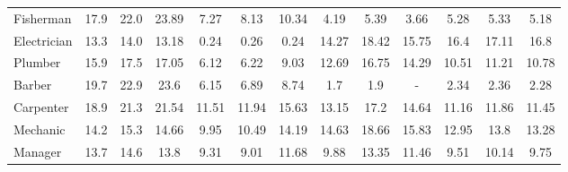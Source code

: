 \begin{table}[htbp!]
{\begin{tabular}{l|ccc|ccc|ccc|ccc}
Fisherman
& \cellcolor{purple9} 17.9 & \cellcolor{green10} 22.0 & \cellcolor{green10} 23.89
&\cellcolor{purple4} 7.27 & \cellcolor{purple5} 8.13 & \cellcolor{green6} 10.34
&\cellcolor{purple3} 4.19 & \cellcolor{green3} 5.39 & \cellcolor{purple2} 3.66
&\cellcolor{green3} 5.28 & \cellcolor{green3} 5.33 & \cellcolor{green3} 5.18
\\
Electrician
& \cellcolor{purple7} 13.3 & \cellcolor{purple8} 14.0 & \cellcolor{purple7} 13.18
&\cellcolor{green1} 0.24 & \cellcolor{green1} 0.26 & \cellcolor{green1} 0.24
&\cellcolor{purple8} 14.27 & \cellcolor{purple10} 18.42 & \cellcolor{purple8} 15.75
&\cellcolor{purple9} 16.4 & \cellcolor{purple9} 17.11 & \cellcolor{purple9} 16.8
\\
Plumber
& \cellcolor{purple8} 15.9 & \cellcolor{purple9} 17.5 & \cellcolor{purple9} 17.05
&\cellcolor{purple4} 6.12 & \cellcolor{purple4} 6.22 & \cellcolor{purple5} 9.03
&\cellcolor{purple7} 12.69 & \cellcolor{purple9} 16.75 & \cellcolor{purple8} 14.29
&\cellcolor{purple6} 10.51 & \cellcolor{green6} 11.21 & \cellcolor{purple6} 10.78
\\
Barber
& \cellcolor{purple10} 19.7 & \cellcolor{purple10} 22.9 & \cellcolor{purple10} 23.6
&\cellcolor{purple4} 6.15 & \cellcolor{purple4} 6.89 & \cellcolor{green5} 8.74
&\cellcolor{green1} 1.7 & \cellcolor{green1} 1.9 & \cellcolor{lightgray} -
&\cellcolor{green2} 2.34 & \cellcolor{green2} 2.36 & \cellcolor{green2} 2.28
\\
Carpenter
& \cellcolor{purple10} 18.9 & \cellcolor{purple10} 21.3 & \cellcolor{purple10} 21.54
&\cellcolor{purple6} 11.51 & \cellcolor{purple6} 11.94 & \cellcolor{purple8} 15.63
&\cellcolor{purple7} 13.15 & \cellcolor{purple9} 17.2 & \cellcolor{purple8} 14.64
&\cellcolor{purple6} 11.16 & \cellcolor{purple6} 11.86 & \cellcolor{purple6} 11.45
\\
Mechanic
& \cellcolor{purple8} 14.2 & \cellcolor{purple8} 15.3 & \cellcolor{purple8} 14.66
&\cellcolor{purple5} 9.95 & \cellcolor{purple6} 10.49 & \cellcolor{purple8} 14.19
&\cellcolor{purple8} 14.63 & \cellcolor{purple10} 18.66 & \cellcolor{purple8} 15.83
&\cellcolor{purple7} 12.95 & \cellcolor{purple7} 13.8 & \cellcolor{purple7} 13.28
\\
Manager
& \cellcolor{purple7} 13.7 & \cellcolor{purple8} 14.6 & \cellcolor{purple7} 13.8
&\cellcolor{purple5} 9.31 & \cellcolor{purple5} 9.01 & \cellcolor{purple6} 11.68
&\cellcolor{purple5} 9.88 & \cellcolor{green7} 13.35 & \cellcolor{purple6} 11.46
&\cellcolor{purple5} 9.51 & \cellcolor{green6} 10.14 & \cellcolor{purple5} 9.75
\\

\end{tabular}}
\end{table}
